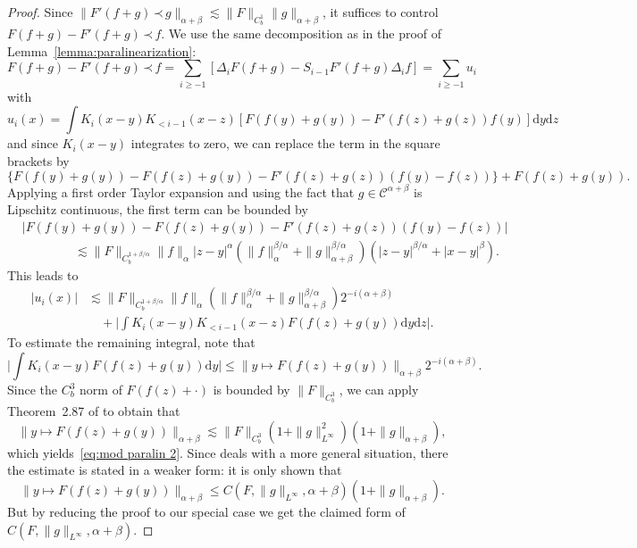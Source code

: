 \documentclass[a4paper,11pt]{article}
\newcommand{\mathd}{\mathrm{d}}
\theoremstyle{remark}
\renewcommand{\le}{\leqslant}
\newcommand{\CC}{\ensuremath{\mathscr{C}}}
\newcommand{\lpara}{\,\mathord{\prec}\,}
\begin{document}
\begin{proof}
   Since $\|F'(f+g) \lpara g \|_{\alpha+\beta} \lesssim \| F\|_{C^1_b} \| g \|_{\alpha+\beta}$, it suffices to control $F(f+g) - F'(f+g) \lpara f$. We use the same decomposition as in the proof of Lemma~\ref{lemma:paralinearization}:
   \[
      F(f+g) - F'(f+g)\lpara f = \sum_{i \geqslant -1} [\Delta_i F(f+g) - S_{i-1} F'(f+g) \Delta_i f] = \sum_{i \geqslant -1} u_i
   \]
   with
  \[
     u_i ( x ) = \int K_{i} ( x-y ) K_{<i-1} ( x-z ) [F ( f ( y) + g(y) ) - F'(f(z) + g(z)) f(y)] \mathd y \mathd z
  \]
  and since $K_i(x-y)$ integrates to zero, we can replace the term in the square brackets by
  \[
     \{F ( f ( y ) + g(y) ) - F ( f (z) + g(y)) - F'(f(z)+g(z)) (f(y) - f(z))\} + F(f(z) + g(y)).
  \]
  Applying a first order Taylor expansion and using the fact that $g \in \CC^{\alpha+\beta}$ is Lipschitz continuous, the first term can be bounded by
  \begin{align*}
     &|F ( f ( y ) + g(y) ) - F ( f (z) + g(y)) - F'(f(z)+g(z)) (f(y) - f(z))| \\
     &\hspace{50pt}\lesssim \|F\|_{C^{1+\beta/\alpha}_b} \|f \|_\alpha  |z-y|^\alpha (\|f \|_\alpha^{\beta/\alpha} + \| g \|_{\alpha+\beta}^{\beta/\alpha}) ( |z-y|^{\beta/\alpha} + |x-y|^{\beta}).
  \end{align*}
  This leads to
  \begin{align}\label{eq:mod paralin pr1} \nonumber
     |u_i ( x )| & \lesssim \|F\|_{C^{1+\beta/\alpha}_b} \|f \|_\alpha (\|f \|_\alpha^{\beta/\alpha} + \| g \|_{\alpha+\beta}^{\beta/\alpha}) 2^{-i(\alpha+\beta)} \\
     &\quad + \Big| \int K_{i} ( x-y ) K_{<i-1} ( x-z ) F(f(z) + g(y)) \mathd y \mathd z \Big|.
  \end{align}
  To estimate the remaining integral, note that
  \[
     \Big| \int K_i(x-y) F(f(z) + g(y)) \mathd y \Big| \leqslant \| y \mapsto F(f(z) + g(y)) \|_{\alpha+\beta} 2^{-i(\alpha+\beta)}.
  \]
  Since the $C^3_b$ norm of $F(f(z) + \cdot)$ is bounded by $\|F \|_{C^3_b}$, we can apply Theorem~2.87 of \cite{Bahouri2011} to obtain that
  \[
     \| y \mapsto F(f(z) + g(y)) \|_{\alpha+\beta} \lesssim \|F \|_{C^3_b} (1 + \|g\|_{L^\infty}^2) (1 + \|g\|_{\alpha+\beta}),
  \]
  which yields~\eqref{eq:mod paralin 2}. Since \cite{Bahouri2011} deals with a more general situation, there the estimate is stated in a weaker form: it is only shown that
  \[
     \| y \mapsto F(f(z) + g(y)) \|_{\alpha+\beta} \le C(F,\|g\|_{L^\infty},\alpha+\beta)(1 + \|g\|_{\alpha+\beta}).
  \]
  But by reducing the proof to our special case we get the claimed form of $C(F,\|g\|_{L^\infty},\alpha+\beta)$.
\end{proof}
\end{document}
